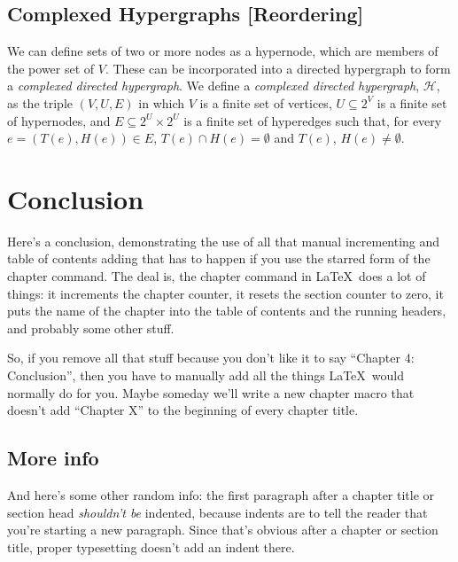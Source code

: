 \documentclass[12pt,twoside]{reedthesis}
\newcommand{\new}[2]{{\color{orange}#1 [#2]}}
\theoremstyle{definition}
\begin{document}
 \section{\new{Complexed Hypergraphs}{Reordering}}

 \new{
 We can define sets of two or more nodes as a hypernode, which are members of the power set of $V$.  These can be incorporated into a directed hypergraph to form a \textit{complexed directed hypergraph}.  We define a \textit{complexed directed hypergraph}, $\mathcal{H}$, as the triple $(V,U,E)$ in which $V$ is a finite set of vertices, $U \subseteq 2^V$ is a finite set of hypernodes, and $E \subseteq 2^U \times 2^U$ is a finite set of hyperedges such that, for every $e=(T(e),H(e)) \in E$, $T(e) \cap H(e) = \emptyset$ and $T(e)$, $H(e) \neq \emptyset$.\par}{Reordering}

\chapter*{Conclusion}
	\setcounter{chapter}{4}
	\setcounter{section}{0}

Here's a conclusion, demonstrating the use of all that manual incrementing and table of contents adding that has to happen if you use the starred form of the chapter command. The deal is, the chapter command in \LaTeX\ does a lot of things: it increments the chapter counter, it resets the section counter to zero, it puts the name of the chapter into the table of contents and the running headers, and probably some other stuff.

So, if you remove all that stuff because you don't like it to say ``Chapter 4: Conclusion'', then you have to manually add all the things \LaTeX\ would normally do for you. Maybe someday we'll write a new chapter macro that doesn't add ``Chapter X'' to the beginning of every chapter title.

\section{More info}
And here's some other random info: the first paragraph after a chapter title or section head \emph{shouldn't be} indented, because indents are to tell the reader that you're starting a new paragraph. Since that's obvious after a chapter or section title, proper typesetting doesn't add an indent there.
\end{document}
